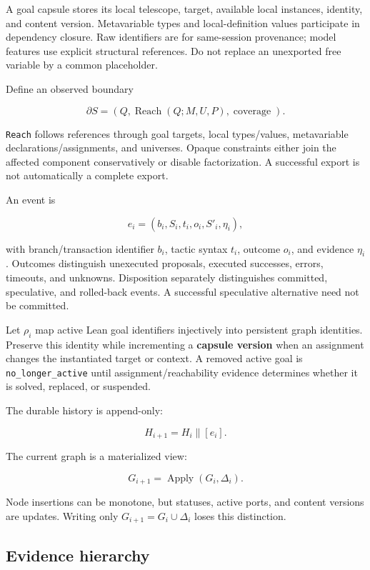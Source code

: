 \documentclass[
  10pt,
]{article}
\begin{document}
A goal capsule stores its local telescope, target, available local
instances, identity, and content version. Metavariable types and
local-definition values participate in dependency closure. Raw
identifiers are for same-session provenance; model features use explicit
structural references. Do not replace an unexported free variable by a
common placeholder.

Define an observed boundary

\[\partial S=(Q,\operatorname{Reach}(Q;M,U,P),\operatorname{coverage}).\]

\texttt{Reach} follows references through goal targets, local
types/values, metavariable declarations/assignments, and universes.
Opaque constraints either join the affected component conservatively or
disable factorization. A successful export is not automatically a
complete export.

An event is

\[e_i=(b_i,S_i,t_i,o_i,S'_i,\eta_i),\]

with branch/transaction identifier \(b_i\), tactic syntax \(t_i\),
outcome \(o_i\), and evidence \(\eta_i\). Outcomes distinguish
unexecuted proposals, executed successes, errors, timeouts, and
unknowns. Disposition separately distinguishes committed, speculative,
and rolled-back events. A successful speculative alternative need not be
committed.

Let \(\rho_i\) map active Lean goal identifiers injectively into
persistent graph identities. Preserve this identity while incrementing a
\textbf{capsule version} when an assignment changes the instantiated
target or context. A removed active goal is \texttt{no\_longer\_active}
until assignment/reachability evidence determines whether it is solved,
replaced, or suspended.

The durable history is append-only:

\[H_{i+1}=H_i\mathbin{\|}[e_i].\]

The current graph is a materialized view:

\[G_{i+1}=\operatorname{Apply}(G_i,\Delta_i).\]

Node insertions can be monotone, but statuses, active ports, and content
versions are updates. Writing only \(G_{i+1}=G_i\cup\Delta_i\) loses
this distinction.

\subsection{Evidence hierarchy}\label{evidence-hierarchy}
\end{document}
